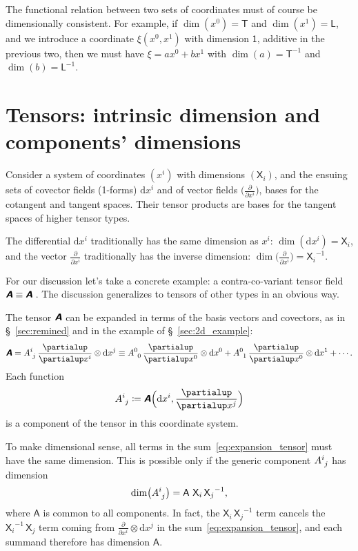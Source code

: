 \documentclass[\ifafour a4paper,12pt,\else a5paper,10pt,\fi%
onecolumn,oneside,article,%
british%
]{memoir}
\makeatletter
\theoremstyle{remark}
\theoremstyle{innote}
\newcommand*{\mathte}[1]{\textbf{\textit{\textsf{#1}}}}
\newcommand*{\de}{\partialup}%
\newcommand*{\di}{\mathrm{d}}%
\newcommand*{\defd}{\coloneqq}
\renewcommand*{\|}[1][]{\nonscript\,#1\vert\nonscript\;\mathopen{}}
\newcommand*{\sect}{\S}%
\newcommand*{\q}{}%
\DeclareRobustCommand*{\q}{%
  \mathbin{\mathpalette\bigcdot@{}}%
}
\newcommand*{\bigcdot@scalefactor}{0.7}
\newcommand*{\bigcdot@widthfactor}{1.5}
\newcommand*{\bigcdot@}[2]{%
  \sbox0{$#1\vcenter{}$}%
  \sbox2{$#1\cdot\m@th$}%
  \hbox to \bigcdot@widthfactor\wd2{%
    \hfil
    \raise\ht0\hbox{%
      \scalebox{\bigcdot@scalefactor}{%
        \lower\ht0\hbox{$#1\bullet\m@th$}%
      }%
    }%
    \hfil
  }%
}
\newcommand*{\Un}{\textsf{1}}
\newcommand*{\Le}{\textsf{L}}
\newcommand*{\Ti}{\textsf{T}}
\newcommand*{\Xx}{\textsf{X}}
\newcommand*{\Aa}{\textsf{A}}
\newcommand*{\yA}{\mathte{A}}
\renewcommand*{\i}{\indices}
\newcommand*{\dex}[1][i]{\frac{\de}{\de x^{#1}}}
\newcommand*{\dix}[1][i]{\di x^{#1}}
\makeatother
\begin{document}
The functional relation between two sets of coordinates must of course be
dimensionally consistent. For example, if $\dim(x^{0})=\Ti$ and
$\dim(x^{1})=\Le$, and we introduce a coordinate $\xi(x^{0},x^{1})$ with
dimension $\Un$, additive in the previous two, then we must have
$\xi = a x^{0} + b x^{1}$ with $\dim(a) = \Ti^{-1}$ and
$\dim(b) = \Le^{-1}$.


\section{Tensors: intrinsic dimension and components' dimensions}
\label{sec:tensors}

Consider a system of coordinates $(x^i)$ with dimensions $(\Xx_i)$, and the
ensuing sets of covector fields (1-forms) $\dix$ and of vector fields
$\bigl(\dex\bigr)$, bases for the cotangent and tangent spaces. Their
tensor products are bases for the tangent spaces of higher tensor types.

The differential $\dix$ traditionally has the same dimension as $x^{i}$:
$\dim(\dix) = \Xx_{i}$, and the vector $\dex$ traditionally has the
inverse dimension: $\dim\bigl(\dex\bigr) = {\Xx_{i}}^{-1}$.

For our discussion let's take a concrete example: a contra-co-variant tensor
field $\yA \equiv \yA\i{^{\q}_{\q}}$\,. The discussion generalizes to tensors
of other types in an obvious way.

The tensor $\yA$ can be expanded in terms of the basis vectors and
covectors, as in \sect~\ref{sec:remined} and in the example of
\sect~\ref{sec:2d_example}:
\begin{equation}
  \label{eq:expansion_tensor}
  \yA = A\i{^{i}_{j}}\, \dex\otimes\dix[j]
  \equiv A\i{^{0}_{0}}\,\dex[0]\otimes\dix[0] + 
  A\i{^{0}_{1}}\,\dex[0]\otimes\dix[1] + \dotsb {}.
\end{equation}
Each function
\begin{equation}
  A\i{^{i}_{j}} \defd  \yA\Bigl(\dix, \dex[j]\Bigr)
  \label{eq:components_def}
\end{equation}
is a component of the tensor in this coordinate system.

\medskip

To make dimensional sense, all terms in the sum~\eqref{eq:expansion_tensor}
must have the same dimension. This is possible only if the generic
component $A\i{^{i}_{j}}$ has dimension
\begin{equation}
  \label{eq:dim_component}
  \dim\bigl(A\i{^{i}_{j}}\bigr) = \Aa\ {\Xx_{i}}\,{\Xx_{j}}^{-1},
\end{equation}
where $\Aa$ is common to all components. In fact, the
${\Xx_{i}}\,{\Xx_{j}}^{-1}$ term cancels the ${\Xx_{i}}^{-1}\,{\Xx_{j}}$
term coming from $\dex\otimes\dix[j]$ in the
sum~\eqref{eq:expansion_tensor}, and each summand therefore has dimension
$\Aa$.
\end{document}
